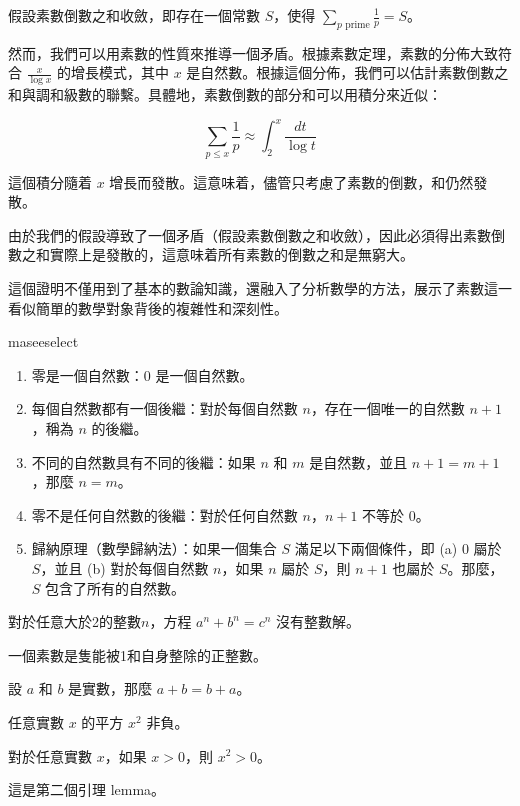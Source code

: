 \documentclass[
    writingLanguage=chinese, %
    addPageTitle=on,  %
    addDeclaration=on, %
    addMUSTlogo=on, %
    addFigTOC=on, %
    addTabTOC=on, %
    refIndent=off, %
    printMod=off, %
]{.def/must}
\begin{document}
假設素數倒數之和收斂，即存在一個常數 \( S \)，使得 \( \sum_{p \text{ prime}} \frac{1}{p} = S \)。

然而，我們可以用素數的性質來推導一個矛盾。根據素數定理，素數的分佈大致符合 \( \frac{x}{\log x} \) 的增長模式，其中 \( x \) 是自然數。根據這個分佈，我們可以估計素數倒數之和與調和級數的聯繫。具體地，素數倒數的部分和可以用積分來近似：

\[
\sum_{p \leq x} \frac{1}{p} \approx \int_2^x \frac{dt}{\log t}
\]

這個積分隨着 \( x \) 增長而發散。這意味着，儘管只考慮了素數的倒數，和仍然發散。

由於我們的假設導致了一個矛盾（假設素數倒數之和收斂），因此必須得出素數倒數之和實際上是發散的，這意味着所有素數的倒數之和是無窮大。

這個證明不僅用到了基本的數論知識，還融入了分析數學的方法，展示了素數這一看似簡單的數學對象背後的複雜性和深刻性。
\begin{axiom}[皮亞諾公理 1]
maseeselect
\begin{enumerate}[label=\Alph*.]
\item 零是一個自然數：$0$ 是一個自然數。
\item 每個自然數都有一個後繼：對於每個自然數 $n$，存在一個唯一的自然數 $n+1$，稱為 $n$ 的後繼。
\item 不同的自然數具有不同的後繼：如果 $n$ 和 $m$ 是自然數，並且 $n+1 = m+1$，那麼 $n = m$。
\item 零不是任何自然數的後繼：對於任何自然數 $n$，$n+1$ 不等於 $0$。
\item 歸納原理（數學歸納法）：如果一個集合 $S$ 滿足以下兩個條件，即 (a) $0$ 屬於 $S$，並且 (b) 對於每個自然數 $n$，如果 $n$ 屬於 $S$，則 $n+1$ 也屬於 $S$。那麼，$S$ 包含了所有的自然數。
\end{enumerate}
\end{axiom}

\begin{theorem}[費馬定理]
對於任意大於2的整數$n$，方程 $a^n + b^n = c^n$ 沒有整數解。
\end{theorem}

\begin{definition}
    一個素數是隻能被1和自身整除的正整數。
\end{definition}
\begin{example}
    設 $a$ 和 $b$ 是實數，那麼 $a+b=b+a$。
\end{example}

\begin{property}
    任意實數 $x$ 的平方 $x^2$ 非負。
\end{property}
\begin{proposition}
    對於任意實數 $x$，如果 $x > 0$，則 $x^2 > 0$。
\end{proposition}
\begin{lemma}
這是第二個引理 lemma。
\end{lemma}
\end{document}
